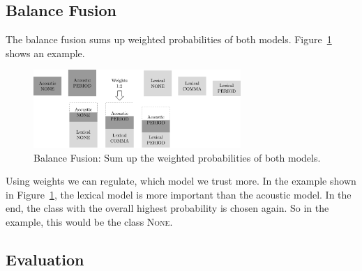 \subsection{Balance Fusion}
The balance fusion sums up weighted probabilities of both models.
Figure~\ref{fig:fusion_2} shows an example.
\begin{figure}[ht]
    \centering
    \includegraphics[width=0.7\textwidth]{img/fusion_2.pdf}
    \caption{Balance Fusion: Sum up the weighted probabilities of both models.}
    \label{fig:fusion_2}
\end{figure}
Using weights we can regulate, which model we trust more.
In the example shown in Figure~\ref{fig:fusion_2}, the lexical model is more important than the acoustic model. 
In the end, the class with the overall highest probability is chosen again.
So in the example, this would be the class \textsc{None}.

\subsection{Evaluation}
